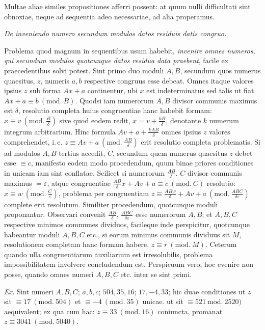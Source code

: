 Multae aliae similes propositiones afferri possent: at quum nulli difficultati sint
obnoxiae, neque ad sequentia adeo necessariae, ad alia properamus.

\begin{center}\small\emph{De inveniendo numero secundum modulos datos residuis datis congruo.}\end{center}


Problema quod magnum in sequentibus usum habebit, \emph{invenire omnes numeros, qui
secundum modulos quotcunque datos residua data praebent}, facile ex praecedentibus
solvi potest. Sint primo duo moduli $A,B$, secundum quos numerus
quaesitus, $z$, numeris $a,b$ respective congruus esse debeat. Omnes itaque valores
ipsius $z$ sub forma $Ax+a$ continentur, ubi $x$ est indeterminatus sed talis ut fiat
$Ax+a\equiv b\ (\mathrm{mod.}\ B)$. Quodsi iam numerorum $A,B$ divisor communis maximus est $\delta$,
resolutio completa huius congruentiae hanc habebit formam: $x\equiv v\ (\mathrm{mod.}\ \frac{B}{\delta})$
sive quod eodem redit, $x=v+\frac{kB}{\delta}$, denotante $k$ numerum integrum arbitrarium.
Hinc formula $Av+a+\frac{kAB}{\delta}$ omnes ipsius $z$ valores comprehendet, i.\,e.
$z\equiv Av+a\ (\mathrm{mod.}\ \frac{AB}{\delta})$ erit resolutio completa problematis. Si ad modulos
$A,B$ tertius accedit, $C$, secundum quem numerus quaesitus $z$ debet esse $\equiv c$,
manifesto eodem modo procedendum, quum binae priores conditiones in unicam iam sint
conflatae. Scilicet si numerorum $\frac{AB}{\delta}.$
$C$ divisor communis maximus $=\varepsilon$, atque congruentiae
$\frac{AB}{\delta}x+Av+a\equiv c\ (\mathrm{mod.}\ C)$ resolutio:
$x\equiv w\ (\mathrm{mod.}\ \frac{C}{\varepsilon})$, problema per congruentiam
$z\equiv\frac{ABw}{\delta}+Av+a\ (\mathrm{mod.}\ \frac{ABC}{\delta\varepsilon})$ complete erit
resolutum. Similiter procedendum, quotcunque moduli proponantur. Observari convenit
$\frac{AB}{\delta}$, $\frac{ABC}{\delta\varepsilon}$ esse numerorum $A,B$; et $A,B,C$
respective minimos communes dividuos, facileque inde perspicitur, quotcunque habeantur
moduli $A,B,C$ etc., si eorum minimus communis dividuus sit $M$, resolutionem completam
hanc formam habere, $z\equiv r\ (\mathrm{mod.}\ M)$. Ceterum quando ulla congruentiarum auxiliarium
est irresolubilis, problema impossibilitatem involvere concludendum est. Perspicuum
vero, hoc evenire non posse, quando omnes numeri $A,B,C$ etc. inter se sint primi.

\emph{Ex.} Sint numeri $A,B,C$; $a,b,c$; $504,35,16$; $17,-4,33$; hic duae conditiones ut
$z$ sit $\equiv 17\ (\mathrm{mod.}\ 504)$ et $\equiv -4\ (\mathrm{mod.}\ 35)$ unicae. ut sit
$\equiv 521\ \mathrm{mod.}\ 2520)$ aequivalent; ex qua cum hac:
$z\equiv 33\ (\mathrm{mod.}\ 16)$ coniuncta, promanat $z\equiv 3041\ (\mathrm{mod.}\ 5040)$.


